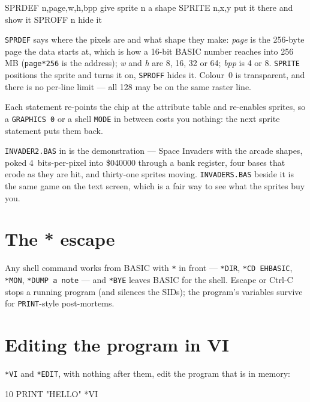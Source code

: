 \begin{type}
SPRDEF n,page,w,h,bpp   give sprite n a shape
SPRITE n,x,y            put it there and show it
SPROFF n                hide it
\end{type}

\verb|SPRDEF| says where the pixels are and what shape they make:
\emph{page} is the 256-byte page the data starts at, which is how a
16-bit BASIC number reaches into 256\,MB (\verb|page*256| is the
address); \emph{w} and \emph{h} are 8, 16, 32 or 64; \emph{bpp} is 4 or
8. \verb|SPRITE| positions the sprite and turns it on, \verb|SPROFF|
hides it. Colour~0 is transparent, and there is no per-line limit --- all
128 may be on the same raster line.

Each statement re-points the chip at the attribute table and re-enables
sprites, so a \verb|GRAPHICS 0| or a shell \verb|MODE| in between costs
you nothing: the next sprite statement puts them back.

\verb|INVADER2.BAS| in  is the demonstration --- Space
Invaders with the arcade shapes, poked 4~bits-per-pixel into \$040000
through a bank register, four bases that erode as they are hit, and
thirty-one sprites moving. \verb|INVADERS.BAS| beside it is the same
game on the text screen, which is a fair way to see what the sprites buy
you.


\section{The * escape}
Any shell command works from BASIC with \verb|*| in front --- \verb|*DIR|,
\verb|*CD EHBASIC|, \verb|*MON|, \verb|*DUMP a note| --- and \verb|*BYE|
leaves BASIC for the shell. Escape or Ctrl-C stops a running program (and
silences the SIDs); the program's variables survive for \verb|PRINT|-style
post-mortems.

\section{Editing the program in VI}\label{sec:basicvi}
\verb|*VI| and \verb|*EDIT|, with nothing after them, edit the program that
is in memory:

\begin{type}
10 PRINT "HELLO"
*VI
\end{type}

